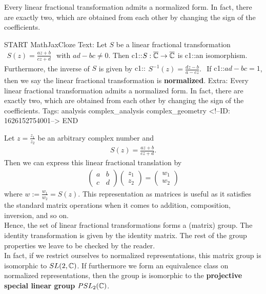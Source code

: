 \documentclass{memoir}
\begin{document}
Every linear fractional transformation admits a normalized form. In fact, there are exactly two, which are obtained from each other by changing the sign of the coefficients.

\begin{anki}
START
MathJaxCloze
Text: Let \(S\) be a linear fractional transformation
\(\begin{align*}
  	S(z) = \frac{az+b}{c z + d}
\end{align*}\)
	with \(ad-bc\neq 0\). Then
{{c1::\(\begin{align*}
	S:\overline{\mathbb{C}}\to \overline{\mathbb{C}}
      \end{align*}\)}} 
	is {{c1::an isomorphism}}. Furthermore, the inverse of \(S\) is given by
{{c1::\(\begin{align*}
	S^{-1}(z) = \frac{dz -b}{a-cz}.
      \end{align*}\)}}
	If {{c1::\(ad-bc = 1\)}}, then we say the linear fractional transformation is \textbf{normalized}.
Extra: Every linear fractional transformation admits a normalized form. In fact, there are exactly two, which are obtained from each other by changing the sign of the coefficients.
Tags: analysis complex_analysis complex_geometry
<!--ID: 1626152754001-->
END
\end{anki}


\begin{general}
	Let \(z = \frac{z_1}{z_2}\) be an arbitrary complex number and
	\begin{align*}
		S(z) = \frac{az+b}{cz+d}.
	\end{align*}
	Then we can express this linear fractional translation by
	\begin{align*}
		\begin{pmatrix} a & b \\ c & d \end{pmatrix} \begin{pmatrix} z_1 \\ z_2 \end{pmatrix} = \begin{pmatrix} w_1 \\ w_2 \end{pmatrix} 
	\end{align*}
	where \(w := \frac{w_1}{w_2} = S(z)\). This representation as matrices is useful as it satisfies the standard matrix operations when it comes to addition, composition, inversion, and so on.\\

	Hence, the set of linear fractional transformations forms a (matrix) group. The identity transformation is given by the identity matrix. The rest of the group properties we leave to be checked by the reader.\\

	In fact, if we restrict ourselves to normalized representations, this matrix group is isomorphic to \(SL(2,\mathbb{C})\). If furthermore we form an equivalence class on normalized representations, then the group is isomorphic to the \textbf{projective special linear group} \(PSL_2(\mathbb{C})\).
\end{general}
\end{document}
